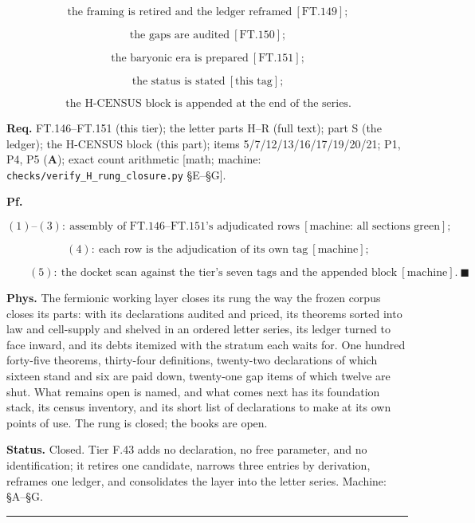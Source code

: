 \documentclass[11pt,openany]{report}
\theoremstyle{canonplain}
\theoremstyle{canondef}
\begin{document}
\[
\ \text{the framing is retired and the ledger reframed}\ [\mathrm{FT.149}];
\]

\[
\ \text{the gaps are audited}\ [\mathrm{FT.150}];
\]

\[
\ \text{the baryonic era is prepared}\ [\mathrm{FT.151}];
\]

\[
\ \text{the status is stated}\ [\text{this tag}];
\]

\[
\ \text{the H-CENSUS block is appended at the end of the series}.
\]

\textbf{Req.} FT.146–FT.151 (this tier); the letter parts H–R (full text); part S (the ledger); the H-CENSUS block (this part); items 5/7/12/13/16/17/19/20/21; P1, P4, P5 (\textbf{A}); exact count arithmetic [math; machine: \texttt{checks/\allowbreak{}verify\_\allowbreak{}H\_\allowbreak{}rung\_\allowbreak{}closure.py} §E–§G].

\textbf{Pf.}

\[
(1)\text{–}(3):\ \text{assembly of FT.146–FT.151's adjudicated rows}\ [\text{machine: all sections green}];
\]

\[
\qquad (4):\ \text{each row is the adjudication of its own tag}\ [\text{machine}];
\]

\[
\qquad (5):\ \text{the docket scan against the tier's seven tags and the appended block}\ [\text{machine}].\ \blacksquare
\]

\textbf{Phys.} The fermionic working layer closes its rung the way the frozen corpus closes its parts: with its declarations audited and priced, its theorems sorted into law and cell-supply and shelved in an ordered letter series, its ledger turned to face inward, and its debts itemized with the stratum each waits for. One hundred forty-five theorems, thirty-four definitions, twenty-two declarations of which sixteen stand and six are paid down, twenty-one gap items of which twelve are shut. What remains open is named, and what comes next has its foundation stack, its census inventory, and its short list of declarations to make at its own points of use. The rung is closed; the books are open.

\textbf{Status.} Closed. Tier F.43 adds no declaration, no free parameter, and no identification; it retires one candidate, narrows three entries by derivation, reframes one ledger, and consolidates the layer into the letter series. Machine: §A–§G.

\vspace{2pt}\noindent\rule{\textwidth}{0.4pt}\vspace{2pt}
\end{document}
